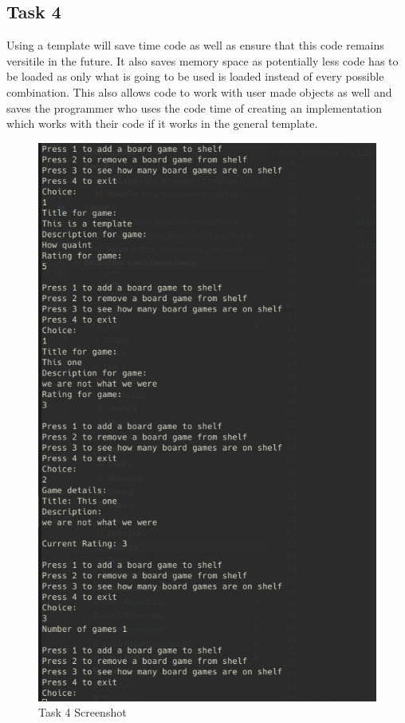 \documentclass[11pt]{article}
\begin{document}
	\subsection{Task 4}
	Using a template will save time code as well as ensure that this code remains versitile in the future. It also saves memory space as potentially less code has to be loaded as only what is going to be used is loaded instead of every possible combination. This also allows code to work with user made objects as well and saves the programmer who uses the code time of creating an implementation which works with their code if it works in the general template.
	
	\begin{figure} [H]
		\centering
		\includegraphics[scale=0.7]{Task4}
		\caption{Task 4 Screenshot}
	\end{figure}
\end{document}
